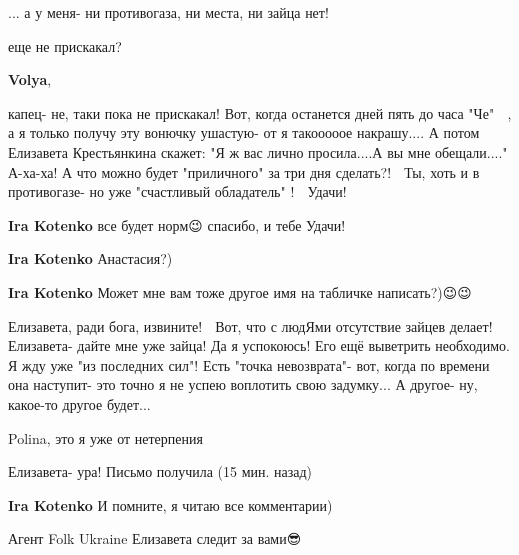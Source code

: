  
 
 
 
 

\qqSecCmt


... а у меня- ни противогаза, ни места, ни зайца нет! 🙂

\begin{itemize} %

еще не прискакал?

\textbf{Volya}, 

капец- не, таки пока не прискакал! Вот, когда останется дней пять до часа "Че"
🙂 , а я только получу эту вонючку ушастую- от я такооооое накрашу.... А потом
Елизавета Крестьянкина скажет: "Я ж вас лично просила....А вы мне обещали...."
А-ха-ха! А что можно будет "приличного" за три дня сделать?! 🙂 Ты, хоть и в
противогазе- но уже "счастливый обладатель" ! 🙂 Удачи!

\textbf{Ira Kotenko} все будет норм😉 спасибо, и тебе Удачи!

\textbf{Ira Kotenko} Анастасия?)

\textbf{Ira Kotenko} Может мне вам тоже другое имя на табличке написать?)😉😉


Елизавета, ради бога, извините! 🙂 Вот, что с людЯми отсутствие зайцев делает!
Елизавета- дайте мне уже зайца! Да я успокоюсь! Его ещё выветрить необходимо. Я
жду уже "из последних сил"! Есть "точка невозврата"- вот, когда по времени она
наступит- это точно я не успею воплотить свою задумку... А другое- ну, какое-то
другое будет...


Polina, это я уже от нетерпения 🙂


Елизавета- ура! Письмо получила (15 мин. назад)

\textbf{Ira Kotenko} И помните, я читаю все комментарии)


Агент Folk Ukraine Елизавета следит за вами😎

\end{itemize} %

